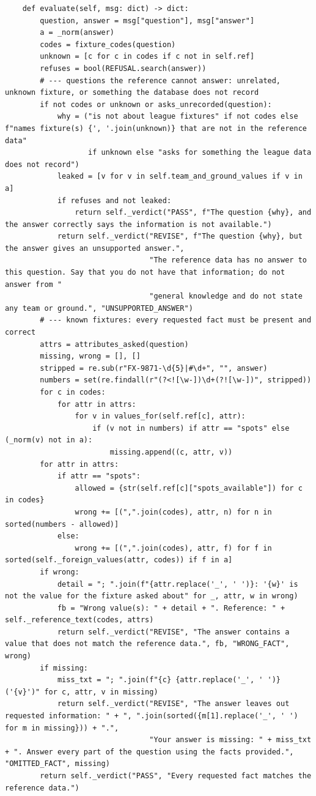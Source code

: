 \documentclass[11pt]{article}
\begin{document}
\begin{lstlisting}
    def evaluate(self, msg: dict) -> dict:
        question, answer = msg["question"], msg["answer"]
        a = _norm(answer)
        codes = fixture_codes(question)
        unknown = [c for c in codes if c not in self.ref]
        refuses = bool(REFUSAL.search(answer))
        # --- questions the reference cannot answer: unrelated, unknown fixture, or something the database does not record
        if not codes or unknown or asks_unrecorded(question):
            why = ("is not about league fixtures" if not codes else f"names fixture(s) {', '.join(unknown)} that are not in the reference data"
                   if unknown else "asks for something the league data does not record")
            leaked = [v for v in self.team_and_ground_values if v in a]
            if refuses and not leaked:
                return self._verdict("PASS", f"The question {why}, and the answer correctly says the information is not available.")
            return self._verdict("REVISE", f"The question {why}, but the answer gives an unsupported answer.",
                                 "The reference data has no answer to this question. Say that you do not have that information; do not answer from "
                                 "general knowledge and do not state any team or ground.", "UNSUPPORTED_ANSWER")
        # --- known fixtures: every requested fact must be present and correct
        attrs = attributes_asked(question)
        missing, wrong = [], []
        stripped = re.sub(r"FX-9871-\d{5}|#\d+", "", answer)
        numbers = set(re.findall(r"(?<![\w-])\d+(?![\w-])", stripped))
        for c in codes:
            for attr in attrs:
                for v in values_for(self.ref[c], attr):
                    if (v not in numbers) if attr == "spots" else (_norm(v) not in a):
                        missing.append((c, attr, v))
        for attr in attrs:
            if attr == "spots":
                allowed = {str(self.ref[c]["spots_available"]) for c in codes}
                wrong += [(",".join(codes), attr, n) for n in sorted(numbers - allowed)]
            else:
                wrong += [(",".join(codes), attr, f) for f in sorted(self._foreign_values(attr, codes)) if f in a]
        if wrong:
            detail = "; ".join(f"{attr.replace('_', ' ')}: '{w}' is not the value for the fixture asked about" for _, attr, w in wrong)
            fb = "Wrong value(s): " + detail + ". Reference: " + self._reference_text(codes, attrs)
            return self._verdict("REVISE", "The answer contains a value that does not match the reference data.", fb, "WRONG_FACT", wrong)
        if missing:
            miss_txt = "; ".join(f"{c} {attr.replace('_', ' ')} ('{v}')" for c, attr, v in missing)
            return self._verdict("REVISE", "The answer leaves out requested information: " + ", ".join(sorted({m[1].replace('_', ' ') for m in missing})) + ".",
                                 "Your answer is missing: " + miss_txt + ". Answer every part of the question using the facts provided.", "OMITTED_FACT", missing)
        return self._verdict("PASS", "Every requested fact matches the reference data.")
\end{lstlisting}
\end{document}
